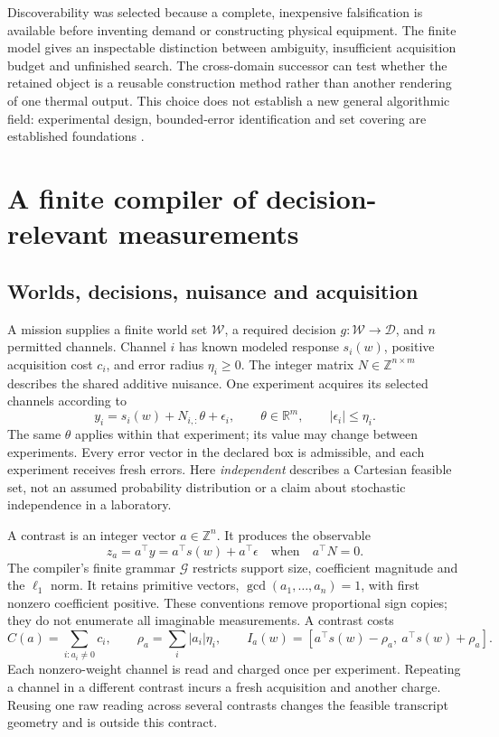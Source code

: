 \documentclass[11pt,letterpaper]{article}
\theoremstyle{definition}\newtheorem{definition}[theorem]{Definition}
\theoremstyle{remark}\newtheorem{remark}[theorem]{Remark}
\newcommand{\R}{\mathbb R}
\newcommand{\Z}{\mathbb Z}
\newcommand{\W}{\mathcal W}
\newcommand{\G}{\mathcal G}
\begin{document}
Discoverability was selected because a complete, inexpensive falsification is available before inventing demand or constructing physical equipment. The finite model gives an inspectable distinction between ambiguity, insufficient acquisition budget and unfinished search. The cross-domain successor can test whether the retained object is a reusable construction method rather than another rendering of one thermal output. This choice does not establish a new general algorithmic field: experimental design, bounded-error identification and set covering are established foundations \citep{pukelsheim,walter,chvatal}.

\section{A finite compiler of decision-relevant measurements}
\label{sec:model}
\subsection{Worlds, decisions, nuisance and acquisition}
A mission supplies a finite world set \(\W\), a required decision \(g:\W\to\mathcal D\), and \(n\) permitted channels. Channel \(i\) has known modeled response \(s_i(w)\), positive acquisition cost \(c_i\), and error radius \(\eta_i\geq0\). The integer matrix \(N\in\Z^{n\times m}\) describes the shared additive nuisance. One experiment acquires its selected channels according to
\begin{equation}
 y_i=s_i(w)+N_{i,:}\theta+\epsilon_i,
 \qquad \theta\in\R^m,\qquad |\epsilon_i|\leq\eta_i .
 \label{eq:observation}
\end{equation}
The same \(\theta\) applies within that experiment; its value may change between experiments. Every error vector in the declared box is admissible, and each experiment receives fresh errors. Here \emph{independent} describes a Cartesian feasible set, not an assumed probability distribution or a claim about stochastic independence in a laboratory.

A contrast is an integer vector \(a\in\Z^n\). It produces the observable
\begin{equation}
 z_a=a^\top y=a^\top s(w)+a^\top\epsilon
 \quad\text{when}\quad a^\top N=0 .
 \label{eq:contrast}
\end{equation}
The compiler's finite grammar \(\G\) restricts support size, coefficient magnitude and the \(\ell_1\) norm. It retains primitive vectors, \(\gcd(a_1,\ldots,a_n)=1\), with first nonzero coefficient positive. These conventions remove proportional sign copies; they do not enumerate all imaginable measurements. A contrast costs
\begin{equation}
 C(a)=\sum_{i:a_i\ne0}c_i,\qquad
 \rho_a=\sum_i|a_i|\eta_i,\qquad
 I_a(w)=[a^\top s(w)-\rho_a,\ a^\top s(w)+\rho_a].
 \label{eq:interval}
\end{equation}
Each nonzero-weight channel is read and charged once per experiment. Repeating a channel in a different contrast incurs a fresh acquisition and another charge. Reusing one raw reading across several contrasts changes the feasible transcript geometry and is outside this contract.
\end{document}
